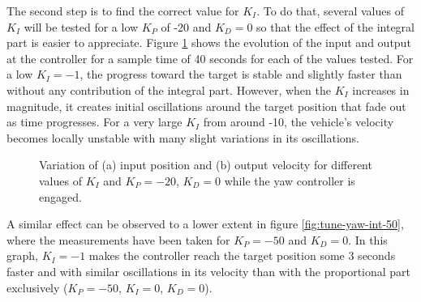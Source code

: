 The second step is to find the correct value for $K_I$. 
To do that, several values of $K_I$ will be tested for a low $K_P$ of -20 and $K_D=0$ so that the effect of the integral part is easier to appreciate. Figure \ref{fig:tune-yaw-int-20} shows the evolution of the input and output at the controller for a sample time of 40 seconds for each of the values tested. 
For a low $K_I=-1$, the progress toward the target is stable and slightly faster than without any contribution of the integral part.
However, when the $K_I$ increases in magnitude, it creates initial oscillations around the target position that fade out as time progresses. For a very large $K_I$ from around -10, the vehicle's velocity becomes locally unstable with many slight variations in its oscillations.

\begin{figure}
  \centering
  \caption{Variation of (a) input position and (b) output velocity for different values of $K_{I}$ and $K_P=-20$, $K_D=0$ while the yaw controller is engaged.}\label{fig:tune-yaw-int-20}
\end{figure}

A similar effect can be observed to a lower extent in figure \ref{fig:tune-yaw-int-50}, where the measurements have been taken for $K_P=-50$ and $K_D=0$. 
In this graph, $K_I=-1$ makes the controller reach the target position some 3 seconds faster and with similar oscillations in its velocity than with the proportional part exclusively ($K_P=-50$, $K_I=0$, $K_D=0$).

